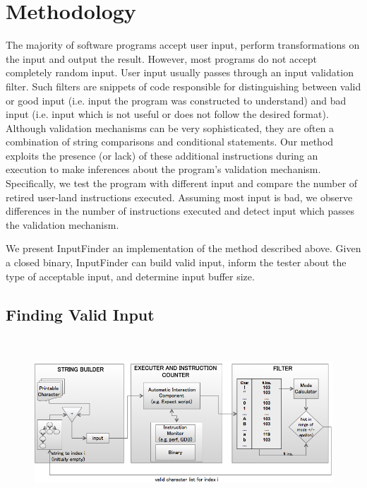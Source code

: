 \documentclass[10pt,twocolumn]{article}
\def \tool {InputFinder}
\begin{document}
\section{Methodology}

The majority of software programs accept user input, perform transformations on the input and output the result.
However, most programs do not accept completely random input.
User input usually passes through an input validation filter.
Such filters are snippets of code responsible for distinguishing between valid or good input (i.e. input the program was constructed to understand) and bad input (i.e. input which is not useful or does not follow the desired format).
Although validation mechanisms can be very sophisticated, they are often a combination of string comparisons and conditional statements.
Our method exploits the presence (or lack) of these additional instructions during an execution to make inferences about the program's validation mechanism.
Specifically, we test the program with different input and compare the number of retired user-land instructions executed.
Assuming most input is bad, we observe differences in the number of instructions executed and detect input which passes the validation mechanism.

We present \tool{} an implementation of the method described above.
Given a closed binary, \tool{} can build valid input, inform the tester about the type of acceptable input, and determine input buffer size.

\subsection{Finding Valid Input}

\begin{figure}[t]
\centering
\includegraphics[height=2.5in,width=6.5in]{architecture.png}
\label{fig:architecture}
\caption{}
\end{figure}
\end{document}
